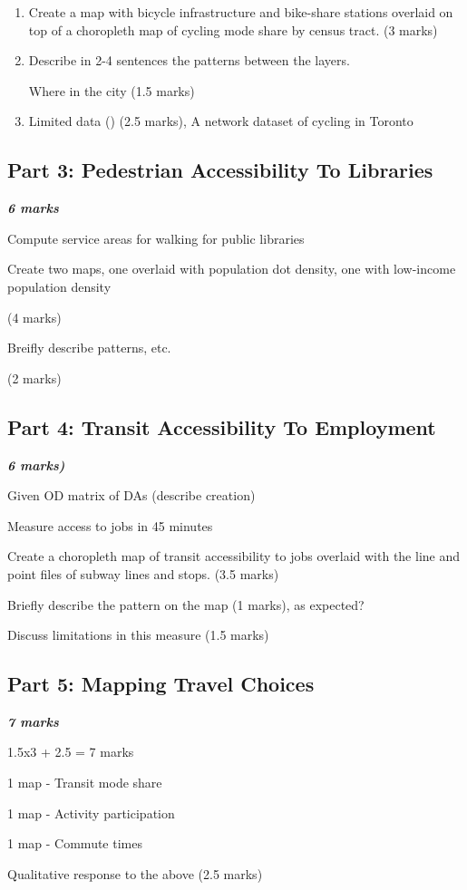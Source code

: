 \documentclass[11pt]{article}
\begin{document}
	
	\begin{enumerate}	
		\item Create a map with bicycle infrastructure and bike-share stations overlaid on top of a choropleth map of cycling mode share by census tract. (3 marks)
		
		\item Describe in 2-4 sentences the patterns between the layers. 
		
		Where in the city (1.5 marks)
		
		\item Limited data () (2.5 marks), A network dataset of cycling in Toronto
		
	\end{enumerate}
	
	
	
	
	
	\subsection*{Part 3: Pedestrian Accessibility To Libraries} 
	
	\textbf{\textit{6 marks}}
	
	Compute service areas for walking for public libraries
	
	Create two maps, one overlaid with population dot density, one with low-income population density 
	
	(4 marks)
	
	Breifly describe patterns, etc.
	
	(2 marks)

	
	
	
	\subsection*{Part 4: Transit Accessibility To Employment}
	
	\textbf{\textit{6 marks)}}
	
	
	Given OD matrix of DAs (describe creation)
	
	Measure access to jobs in 45 minutes
	
	Create a choropleth map of transit accessibility to jobs overlaid with the line and point files of subway lines and stops. (3.5 marks)
	
	Briefly describe the pattern on the map (1 marks), as expected?
	
	Discuss limitations in this measure (1.5 marks)
	
	
	
	
	\subsection*{Part 5: Mapping Travel Choices}
	
	\textbf{\textit{7 marks}}
	
	1.5x3 + 2.5 = 7 marks
	
	1 map - Transit mode share
	
	1 map - Activity participation
	
	1 map - Commute times
	
	Qualitative response to the above  (2.5 marks)

	
	
	
	
	
	
\end{document}
